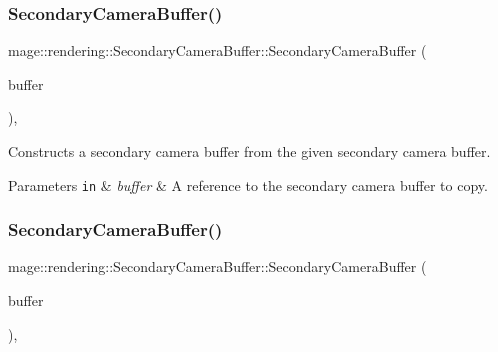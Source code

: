 \subsubsection{\texorpdfstring{Secondary\+Camera\+Buffer()}{SecondaryCameraBuffer()}\hspace{0.1cm}{\footnotesize\ttfamily [2/3]}}
{\footnotesize\ttfamily mage\+::rendering\+::\+Secondary\+Camera\+Buffer\+::\+Secondary\+Camera\+Buffer (\begin{DoxyParamCaption}\item[{const \mbox{\hyperlink{structmage_1_1rendering_1_1_secondary_camera_buffer}{Secondary\+Camera\+Buffer}} \&}]{buffer }\end{DoxyParamCaption})\hspace{0.3cm}{\ttfamily [default]}, {\ttfamily [noexcept]}}

Constructs a secondary camera buffer from the given secondary camera buffer.


\begin{DoxyParams}[1]{Parameters}
\mbox{\tt in}  & {\em buffer} & A reference to the secondary camera buffer to copy. \\
\hline
\end{DoxyParams}
\mbox{\label{structmage_1_1rendering_1_1_secondary_camera_buffer_a72efd73a7db74ad11f12c720b557cf0e}} 
\subsubsection{\texorpdfstring{Secondary\+Camera\+Buffer()}{SecondaryCameraBuffer()}\hspace{0.1cm}{\footnotesize\ttfamily [3/3]}}
{\footnotesize\ttfamily mage\+::rendering\+::\+Secondary\+Camera\+Buffer\+::\+Secondary\+Camera\+Buffer (\begin{DoxyParamCaption}\item[{\mbox{\hyperlink{structmage_1_1rendering_1_1_secondary_camera_buffer}{Secondary\+Camera\+Buffer}} \&\&}]{buffer }\end{DoxyParamCaption})\hspace{0.3cm}{\ttfamily [default]}, {\ttfamily [noexcept]}}


